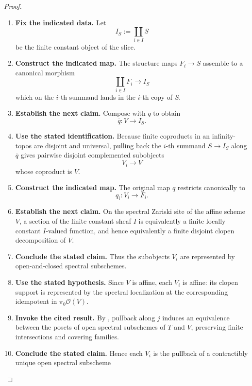 \begin{proof}
\leavevmode
\begin{enumerate}[label=\textup{(\arabic*)}]
    \item \textbf{Fix the indicated data.}
    Let
    \[
    I_S:=\coprod_{i\in I}S
    \]
    be the finite constant object of the slice.
    \item \textbf{Construct the indicated map.}
    The structure maps \(F_i\to S\)
    assemble to a canonical morphism
    \[
    \coprod_{i\in I}F_i\longrightarrow I_S
    \]
    which on the \(i\)-th summand lands in the \(i\)-th copy of \(S\).
    \item \textbf{Establish the next claim.}
    Compose with
    \(q\) to obtain
    \[
    \bar q:V\longrightarrow I_S.
    \]
    \item \textbf{Use the stated identification.}
    Because finite coproducts in an infinity-topos are disjoint and universal, pulling
    back the \(i\)-th summand \(S\to I_S\) along \(\bar q\) gives pairwise disjoint
    complemented subobjects
    \[
    V_i\longrightarrow V
    \]
    whose coproduct is \(V\).
    \item \textbf{Construct the indicated map.}
    The original map \(q\) restricts canonically to
    \[
    q_i:V_i\longrightarrow F_i.
    \]
    \item \textbf{Establish the next claim.}
    On the spectral Zariski site of the affine scheme \(V\), a section of the finite
    constant sheaf \(I\) is equivalently a finite locally constant \(I\)-valued function,
    and hence equivalently a finite disjoint clopen decomposition of \(V\).
    \item \textbf{Conclude the stated claim.}
    Thus the
    subobjects \(V_i\) are represented by open-and-closed spectral subschemes.
    \item \textbf{Use the stated hypothesis.}
    Since
    \(V\) is affine, each \(V_i\) is affine: its clopen support is represented by the
    spectral localization at the corresponding idempotent in
    \(\pi_0\mathcal O(V)\).
    \item \textbf{Invoke the cited result.}
    By
    , pullback along \(j\) induces an
    equivalence between the posets of open spectral subschemes of \(T\) and \(V\),
    preserving finite intersections and covering families.
    \item \textbf{Conclude the stated claim.}
    Hence each \(V_i\) is the
    pullback of a contractibly unique open spectral subscheme

\end{enumerate}
\end{proof}
